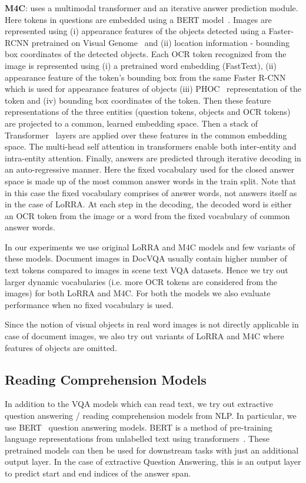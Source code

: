 \documentclass[10pt,twocolumn,letterpaper]{article}
\newcommand{\datasetName}{DocVQA\xspace}
\newcommand{\lorra}{LoRRA\xspace}
\newcommand{\mc}{M4C\xspace}
\begin{document}
\textbf{M4C}: uses a multimodal transformer and an iterative answer prediction module. 
Here tokens in questions are embedded using a BERT model~\cite{bert}. Images are represented using (i) appearance features of the objects detected using a Faster-RCNN pretrained on Visual Genome~\cite{visual_genome} and  (ii) location information - bounding box coordinates of the detected objects. Each OCR token recognized from the image is represented using (i) a pretrained word embedding (FastText), (ii) appearance feature of the token's bounding box from the same Faster R-CNN which is used for appearance features of objects (iii) PHOC~\cite{phoc} representation of the token and (iv) bounding box coordinates of the token. Then these feature representations of the three entities (question tokens, objects and OCR tokens) are projected to a common, learned embedding space. 
Then a stack of Transformer~\cite{attention_is_all_you_need} layers are applied over these features in the common embedding space. 
The multi-head self attention in transformers enable both inter-entity and intra-entity attention. Finally, answers are predicted through iterative decoding in an auto-regressive manner. Here the fixed vocabulary used for the closed answer space is made up of the most common answer words in the train split. Note that in this case the fixed vocabulary comprises of answer words, not answers itself as in the case of \lorra.
At each step in the decoding, the decoded word is either an OCR token from the image or a word from the fixed vocabulary of common answer words.

In our experiments we use original \lorra  and \mc models and few variants of these models.
Document images in \datasetName usually contain higher number of text tokens compared to images in scene text VQA datasets. Hence we try out larger dynamic vocabularies (i.e. more OCR tokens are considered from the images) for both \lorra and \mc. For both the models we also evaluate performance when no fixed vocabulary is used.


Since the notion of visual objects in real word images is not directly applicable in case of document images, we also try out variants of \lorra and \mc where features of objects are omitted.

\subsection{Reading Comprehension Models}
\label{sec:RC_models}
In addition to the VQA models which can read text, we try out extractive question answering / reading comprehension models from NLP. In particular, we use BERT~\cite{bert} question answering models. BERT is a method of pre-training language representations from unlabelled text using transformers~\cite{attention_is_all_you_need}. These pretrained models can then be used for downstream tasks with just an additional output layer. In the case of extractive Question Answering, this is an output layer to predict start and end indices of the answer span.
\end{document}

